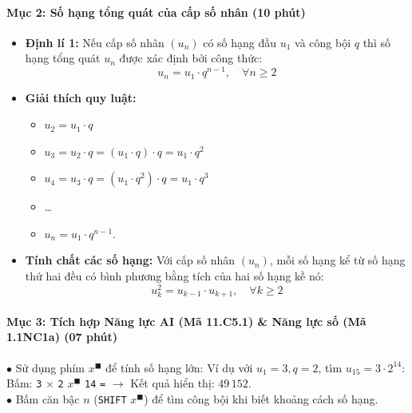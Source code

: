 \documentclass[12pt, a4paper]{article}
\begin{document}
\paragraph{Mục 2: Số hạng tổng quát của cấp số nhân (10 phút)}
\begin{itemize}
    \item \textbf{Định lí 1:} Nếu cấp số nhân $(u_n)$ có số hạng đầu $u_1$ và công bội $q$ thì số hạng tổng quát $u_n$ được xác định bởi công thức:
    $$u_n = u_1 \cdot q^{n-1}, \quad \forall n \ge 2$$
    \item \textbf{Giải thích quy luật:}
    \begin{itemize}
        \item $u_2 = u_1 \cdot q$
        \item $u_3 = u_2 \cdot q = (u_1 \cdot q) \cdot q = u_1 \cdot q^2$
        \item $u_4 = u_3 \cdot q = (u_1 \cdot q^2) \cdot q = u_1 \cdot q^3$
        \item \dots
        \item $u_n = u_1 \cdot q^{n-1}$.
    \end{itemize}
    \item \textbf{Tính chất các số hạng:} Với cấp số nhân $(u_n)$, mỗi số hạng kể từ số hạng thứ hai đều có bình phương bằng tích của hai số hạng kề nó:
    $$u_k^2 = u_{k-1} \cdot u_{k+1}, \quad \forall k \ge 2$$
\end{itemize}


\paragraph{Mục 3: Tích hợp Năng lực AI (Mã 11.C5.1) \& Năng lực số (Mã 1.1NC1a) (07 phút)}


\begin{pedabox}
    $\bullet$ Sử dụng phím $x^\blacksquare$ để tính số hạng lớn: Ví dụ với $u_1 = 3, q = 2$, tìm $u_{15} = 3 \cdot 2^{14}$:\\
    Bấm: \texttt{3} $\times$ \texttt{2} $x^\blacksquare$ \texttt{14} \texttt{=} $\to$ Kết quả hiển thị: $49\,152$.\\[0.3em]
    $\bullet$ Bấm căn bậc $n$ (\texttt{SHIFT} $x^\blacksquare$) để tìm công bội khi biết khoảng cách số hạng.
\end{pedabox}
\end{document}
